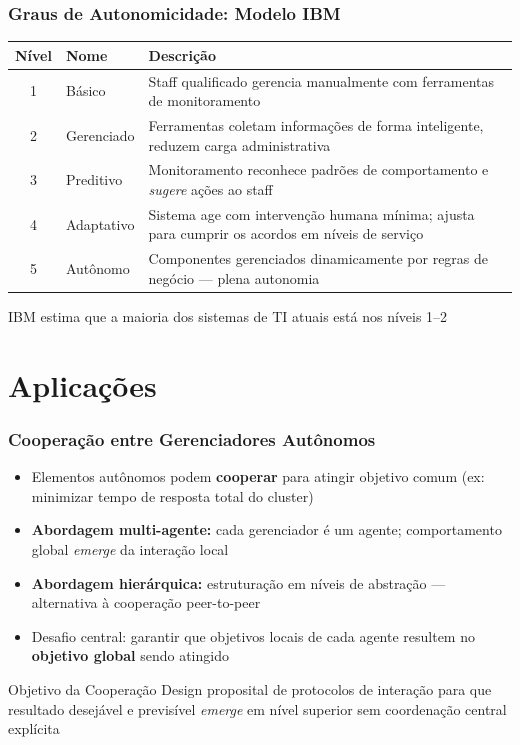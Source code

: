 \documentclass{beamer}
\begin{document}
  
  \begin{frame}
    \frametitle{Graus de Autonomicidade: Modelo IBM}
    \footnotesize
    \begin{tabular}{cp{1.8cm}p{5.8cm}}
      \toprule
      \textbf{Nível} & \textbf{Nome} & \textbf{Descrição} \\
      \midrule
      1 & Básico     & Staff qualificado gerencia manualmente com ferramentas de monitoramento \\
      2 & Gerenciado & Ferramentas coletam informações de forma inteligente, reduzem carga administrativa \\
      3 & Preditivo  & Monitoramento reconhece padrões de comportamento e \textit{sugere} ações ao staff \\
      4 & Adaptativo & Sistema age com intervenção humana mínima; ajusta para cumprir os acordos em níveis de serviço \\
      5 & Autônomo   & Componentes gerenciados dinamicamente por regras de negócio --- plena autonomia \\
      \bottomrule
    \end{tabular}
    \vspace{0.2cm}
    \begin{block}{}
      IBM estima que a maioria dos sistemas de TI atuais está nos níveis 1--2
    \end{block}
  \end{frame}


  \section{Aplicações}

  \begin{frame}
    \frametitle{Cooperação entre Gerenciadores Autônomos}
    \begin{itemize}
      \item Elementos autônomos podem \textbf{cooperar} para atingir objetivo comum (ex: minimizar tempo de resposta total do cluster)
      \item \textbf{Abordagem multi-agente:} cada gerenciador é um agente; comportamento global \textit{emerge} da interação local
      \item \textbf{Abordagem hierárquica:} estruturação em níveis de abstração --- alternativa à cooperação peer-to-peer
      \item Desafio central: garantir que objetivos locais de cada agente resultem no \textbf{objetivo global} sendo atingido
    \end{itemize}
    \vspace{0.2cm}
    \begin{block}{Objetivo da Cooperação}
      Design proposital de protocolos de interação para que resultado desejável e previsível \textit{emerge} em nível superior sem coordenação central explícita
    \end{block}
  \end{frame}
\end{document}
